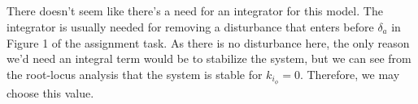 \subsection{}
There doesn't seem like there's a need for an integrator for this model. The integrator is usually needed for removing a disturbance that enters before $\delta_a$ in Figure 1 of the assignment task. As there is no disturbance here, the only reason we'd need an integral term would be to stabilize the system, but we can see from the root-locus analysis that the system is stable for $k_{i_\phi} = 0$. Therefore, we may choose this value. 
